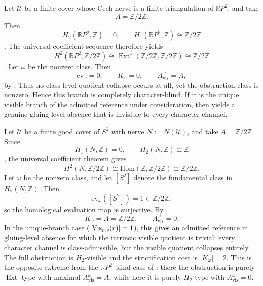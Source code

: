 \begin{example}\label{ex:rp2-character-blind}
Let $\mathcal U$ be a finite cover whose Cech nerve is a finite triangulation of $\mathbb{R}P^2$, and take
\[
A=\mathbb Z/2\mathbb Z.
\]
Then
\[
H_2(\mathbb{R}P^2,\mathbb Z)=0,
\qquad
H_1(\mathbb{R}P^2,\mathbb Z)\cong \mathbb Z/2\mathbb Z
\]
\cite[Sec.~2.2]{Hatcher2002}. The universal coefficient sequence therefore yields
\[
H^2(\mathbb{R}P^2,\mathbb Z/2\mathbb Z)
\cong
\operatorname{Ext}^1(\mathbb Z/2\mathbb Z,\mathbb Z/2\mathbb Z)
\cong
\mathbb Z/2\mathbb Z
\]
\cite[Sec.~3.1]{Hatcher2002}. Let $\omega$ be the nonzero class. Then
\[
\mathrm{ev}_{\omega}=0,
\qquad
K_{\omega}=0,
\qquad
A_{\mathrm{vis}}^{\omega}=A,
\]
by . Thus no class-level quotient collapse occurs at all, yet the obstruction class is nonzero. Hence this branch is completely character-blind. If it is the unique visible branch of the admitted reference under consideration, then  yields a genuine gluing-level absence that is invisible to every character channel.
\end{example}

\begin{example}\label{ex:s2-single-branch-maximal-collapse}
Let $\mathcal U$ be a finite good cover of $S^2$ with nerve $N := N(\mathcal U)$, and take $A = \mathbb{Z}/2\mathbb{Z}$. Since
\[
H_1(N,\mathbb Z) = 0,
\qquad
H_2(N,\mathbb Z) \cong \mathbb Z
\]
\cite[Secs.~2.1, 2.2]{Hatcher2002}, the universal coefficient theorem gives
\[
H^2(N, \mathbb{Z}/2\mathbb{Z})
\cong
\mathrm{Hom}(\mathbb{Z}, \mathbb{Z}/2\mathbb{Z})
\cong
\mathbb{Z}/2\mathbb{Z}.
\]
Let $\omega$ be the nonzero class, and let $[S^2]$ denote the fundamental class in $H_2(N,\mathbb Z)$. Then
\[
\mathrm{ev}_\omega([S^2]) = 1 \in \mathbb{Z}/2\mathbb{Z},
\]
so the homological evaluation map is surjective. By ,
\[
K_\omega = A = \mathbb{Z}/2\mathbb{Z},
\qquad
A_{\mathrm{vis}}^\omega = 0.
\]
In the unique-branch case ($|\mathrm{Vis}_{p,s}(r)| = 1$), this gives an admitted reference in gluing-level absence for which the intrinsic visible quotient is trivial: every character channel is class-admissible, but the visible quotient collapses entirely. The full obstruction is $H_2$-visible and the strictification cost is $|K_\omega| = 2$. This is the opposite extreme from the $\mathbb{R}P^2$ blind case of : there the obstruction is purely $\operatorname{Ext}$-type with maximal $A_{\mathrm{vis}}^\omega = A$, while here it is purely $H_2$-type with $A_{\mathrm{vis}}^\omega = 0$.
\end{example}

